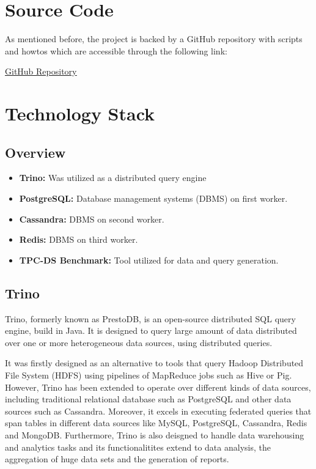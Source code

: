 \documentclass[conference]{IEEEtran}
\begin{document}
\section{Source Code}
As mentioned before, the project is backed by a GitHub repository with scripts and howtos which are accessible
through the following link:

\begin{center}
\textcolor{linkblue}{\underline{\href{https://github.com/alex1on/Information-Systems-NTUA}{GitHub Repository}}}
\end{center}

\section{Technology Stack}

\subsection{Overview}

\begin{itemize}
    \item \textbf{Trino:} Was utilized as a distributed query engine
    \item \textbf{PostgreSQL:} Database management systems (DBMS) on first worker.
    \item \textbf{Cassandra:} DBMS on second worker.
    \item \textbf{Redis:} DBMS on third worker.
    \item \textbf{TPC-DS Benchmark:} Tool utilized for data and query generation.
\end{itemize}

\subsection{Trino}

Trino, formerly known as PrestoDB, is an open-source distributed SQL query engine, build in Java. It is designed to query large amount of data
distributed over one or more heterogeneous data sources, using distributed queries.

It was firstly designed as an alternative to tools that query Hadoop Distributed File System (HDFS) using pipelines of MapReduce jobs such as Hive 
or Pig. However, Trino has been extended to operate over different kinds of data sources, including traditional relational database such as PostgreSQL 
and other data sources such as Cassandra. Moreover, it excels in executing federated queries that span tables in different data sources like MySQL, PostgreSQL, Cassandra, Redis and MongoDB.
Furthermore, Trino is also deisgned to handle data warehousing and analytics tasks and its functionalitites extend to data analysis, the aggregation of huge
data sets and the generation of reports.
\end{document}
